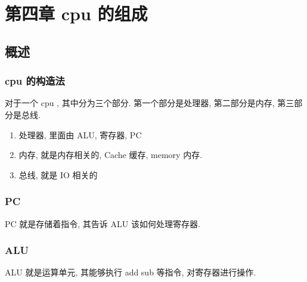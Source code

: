 \documentclass[11pt]{ctexart}
\date{\today}
\title{}
\begin{document}
\tableofcontents

\section{第四章 cpu 的组成}
\label{sec:org497fef1}
\subsection{概述}
\label{sec:orga24b7a9}
\subsubsection{cpu 的构造法}
\label{sec:org9f4d812}
对于一个 cpu , 其中分为三个部分. 第一个部分是处理器, 第二部分是内存,
第三部分是总线.  
\begin{enumerate}
\item 处理器, 里面由 ALU, 寄存器, PC
\item 内存, 就是内存相关的, Cache 缓存, memory 内存.
\item 总线, 就是 IO 相关的
\end{enumerate}
\subsubsection{PC}
\label{sec:org9f96676}
PC 就是存储着指令, 其告诉 ALU 该如何处理寄存器. 
\subsubsection{ALU}
\label{sec:org8853663}
ALU 就是运算单元, 其能够执行 add sub 等指令, 对寄存器进行操作. 
\end{document}
